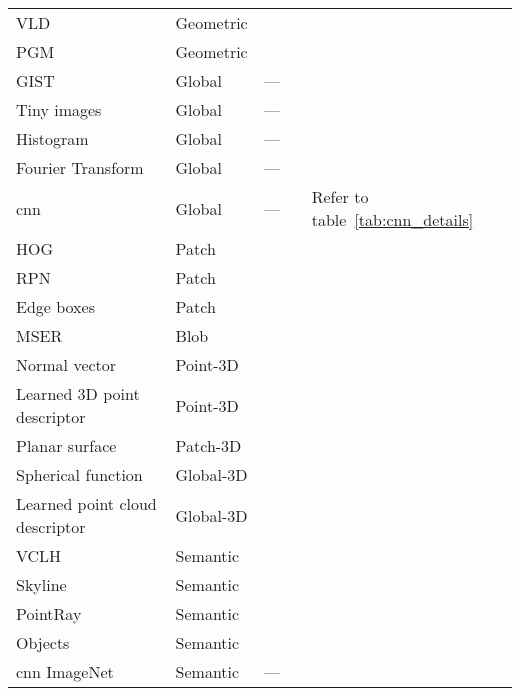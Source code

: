 \begin{landscape}
\begin{table}[t]
{\begin{tabular}{l l c c l}
			VLD \citep{Liu2012}			& Geometric		& \xmark	& \cmark		& \citep{Majdik2013} \\
            PGM \citep{Li2015}			& Geometric		& \xmark	& \cmark		& \citep{Li2015} \\
			\hline
			GIST \citep{Oliva2001} 			& Global 		& ---		& \cmark		& \citep{Hays2008,Russell2011,Murillo2013,Azzi2016} \\
			Tiny images			& Global		& ---		& \cmark		& \citep{Hays2008,Gee2012,Corke2013} \\
			Histogram			& Global		& ---		& \cmark		& \citep{Hays2008,Ni2009} \\
			Fourier Transform	& Global		& ---		& \cmark		& \citep{Wan2016} \\
			\Ac*{cnn} 			& Global		& ---		& \cmark		& Refer to table~\ref{tab:cnn_details} \\
			\hline
			HOG \citep{Dalal2005}			& Patch			& \xmark	& \cmark		& \citep{Shrivastava2011,Aubry2014,McManus2014,Morago2016} \\
			RPN \citep{Ren2015} 			& Patch 		& \cmark	& \xmark		& \citep{Gordo2016} \\
			Edge boxes \citep{Zitnick2014}		& Patch			& \cmark	& \xmark		& \citep{Sunderhauf2015a,Panphattarasap2016,Yan2016} \\
			MSER \citep{Matas2004}			& Blob			& \cmark	& \xmark		& \citep{Kim2015,Nister2006} \\
			\hline
			Normal vector		& Point-3D			& \cmark	& \xmark		& \citep{Li2016,Fernandez-Moral2013} \\
			Learned 3D point descriptor			& Point-3D			& \xmark	& \cmark		& \citep{Zeng2016,Deng2018,Yew2018}\\
			Planar surface & Patch-3D			& \cmark	& \xmark		& \citep{Fernandez-Moral2013} \\			
			Spherical function \citep{Saupe2001}			& Global-3D			& \xmark	& \cmark		& \citep{Lu2015}\\
			Learned point cloud descriptor		& Global-3D			& \xmark	& \cmark		& \citep{Uy2018,Schonberger2017a}\\
			\hline
			VCLH \citep{Cham2010}			& Semantic		& \cmark	& \cmark		& \citep{Cham2010} \\
            Skyline							& Semantic		& \cmark	& \cmark		& \citep{Baatz2012,Tzeng2013,Chen2015} \\
			PointRay \citep{Bansal2014}		& Semantic		& \cmark	& \cmark		& \citep{Bansal2014} \\
			Objects	 						& Semantic		& \xmark	& \cmark		& \citep{Lu2015,Salas-Moreno2013,Ardeshir2014,Qu2015} \\
			\acs*{cnn} ImageNet \citep{Krizhevsky2012} 	& Semantic 		& ---		& \cmark		& \citep{Sunderhauf2015} \\			
			\hline
		\end{tabular}
	}
\end{table}
\end{landscape}